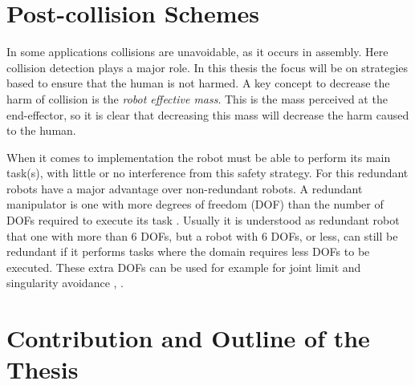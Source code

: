 \section{Post-collision Schemes}
\label{sec:decreasing_harm}

In some applications collisions are unavoidable, as it occurs in assembly. Here collision detection plays a major role. In this thesis the focus will be on strategies based to ensure that the human is not harmed. A key concept to decrease the harm of collision is the \textit{robot effective mass}. This is the mass perceived at the end-effector, so it is clear that decreasing this mass will decrease the harm caused to the human.



When it comes to implementation the  robot must be able to perform its main task(s), with little or no interference from this safety strategy.
For this redundant robots have a major advantage over non-redundant robots. 	A redundant manipulator is one with more degrees of freedom (DOF) than the number of DOFs required to execute its task \cite{redundant}. Usually it is understood as redundant robot that one with more than 6 DOFs, but a robot with 6 DOFs, or less, can still be redundant if it performs tasks where the domain requires less DOFs to be executed. These extra DOFs can be used for example for joint limit and singularity avoidance \cite{JLA_1}, \cite{redundant}.





\section{Contribution and Outline of the Thesis}
\label{sec:contribution_intro}

